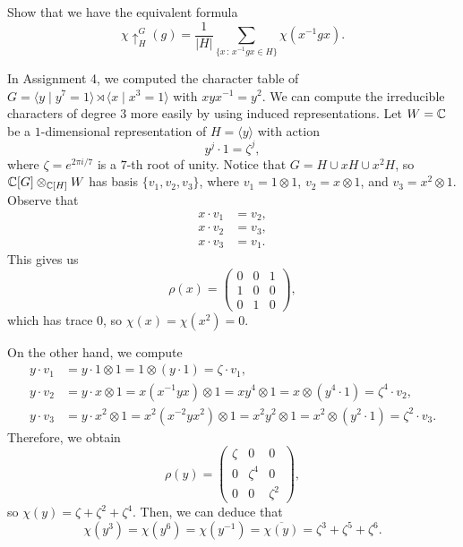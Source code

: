 \begin{exercise}{}
    Show that we have the equivalent formula 
    \[ \chi \uparrow_H^G(g) = \frac{1}{|H|} \sum_{\{x\,:\,x^{-1}gx \in H\}} 
    \chi(x^{-1}gx). \] 
\end{exercise}

\begin{exmp}{}
    In Assignment 4, we computed the character table of 
    $G = \langle y \mid y^7 = 1 \rangle \rtimes \langle x \mid x^3 = 1 \rangle$ 
    with $xyx^{-1} = y^2$. We can compute the irreducible characters of degree 
    $3$ more easily by using induced representations. Let $W = \mathbb{C}$ be a 
    $1$-dimensional representation of $H = \langle y \rangle$ with action 
    \[ y^j \cdot 1 = \zeta^j, \] 
    where $\zeta = e^{2\pi i/7}$ is a $7$-th root of unity. 
    Notice that $G = H \cup xH \cup x^2H$, so $\mathbb{C}[G] \otimes_{\mathbb{C}[H]} W$ 
    has basis $\{v_1, v_2, v_3\}$, where $v_1 = 1 \otimes 1$, $v_2 = x \otimes 1$, 
    and $v_3 = x^2 \otimes 1$. Observe that 
    \begin{align*}
        x \cdot v_1 &= v_2, \\ 
        x \cdot v_2 &= v_3, \\ 
        x \cdot v_3 &= v_1.
    \end{align*}
    This gives us 
    \[ \rho(x) = \begin{pmatrix}
        0 & 0 & 1 \\ 
        1 & 0 & 0 \\ 
        0 & 1 & 0
    \end{pmatrix}, \] 
    which has trace $0$, so $\chi(x) = \chi(x^2) = 0$. 
    
    On the other hand, we compute 
    \begin{align*}
        y \cdot v_1 &= y \cdot 1 \otimes 1 = 1 \otimes (y \cdot 1) = 
        \zeta \cdot v_1, \\ 
        y \cdot v_2 &= y \cdot x \otimes 1 = x(x^{-1}yx) \otimes 1 = 
        xy^4 \otimes 1 = x \otimes (y^4 \cdot 1) = \zeta^4 \cdot v_2, \\
        y \cdot v_3 &= y \cdot x^2 \otimes 1 = x^2(x^{-2}yx^2) \otimes 1 
        = x^2y^2 \otimes 1 = x^2 \otimes (y^2 \cdot 1) = \zeta^2 \cdot v_3. 
    \end{align*} 
    Therefore, we obtain 
    \[ \rho(y) = \begin{pmatrix}
        \zeta & 0 & 0 \\ 
        0 & \zeta^4 & 0 \\ 
        0 & 0 & \zeta^2
    \end{pmatrix}, \] 
    so $\chi(y) = \zeta + \zeta^2 + \zeta^4$. Then, we can deduce that 
    \[ \chi(y^3) = \chi(y^6) = \chi(y^{-1}) = \overline{\chi(y)} 
    = \zeta^3 + \zeta^5 + \zeta^6. \] 
\end{exmp}

